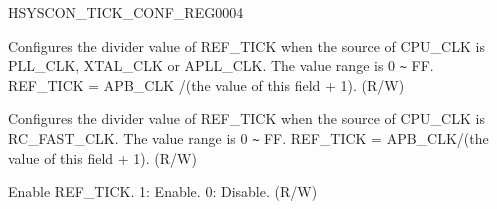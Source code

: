 \begin{register}{H}{SYSCON\_TICK\_CONF\_REG}{\hexprefix{}0004}\label{regdesc:SYSCONTICKCONFREG}
%
%
%
%
\regnewline%
\begin{regdesc}\begin{reglist}
\label{fielddesc:SYSCONXTALTICKNUM}\item [SYSCON\_XTAL\_TICK\_NUM] Configures the divider value of REF\_TICK when the source of CPU\_CLK is PLL\_CLK, XTAL\_CLK or APLL\_CLK. The value range is \hexprefix{}0 \verb+~+ \hexprefix{}FF. REF\_TICK = APB\_CLK /(the value of this field + 1). (R/W)
\label{fielddesc:SYSCONCK8MTICKNUM}\item [SYSCON\_CK8M\_TICK\_NUM] Configures the divider value of REF\_TICK when the source of CPU\_CLK is RC\_FAST\_CLK. The value range is \hexprefix{}0 \verb+~+ \hexprefix{}FF. REF\_TICK = APB\_CLK/(the value of this field + 1). (R/W)
\label{fielddesc:SYSCONXTALTICKENABLE}\item [SYSCON\_TICK\_ENABLE] Enable REF\_TICK. 1: Enable. 0: Disable. (R/W)
\end{reglist}\end{regdesc}
\end{register}
